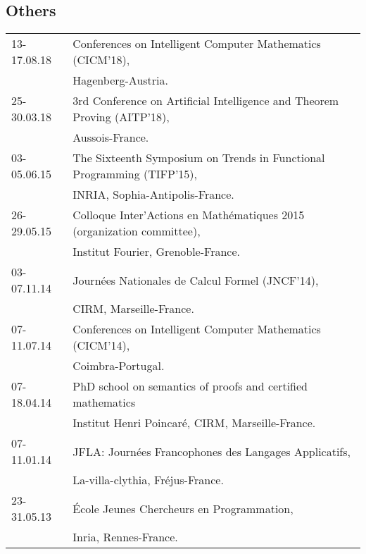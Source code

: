 \documentclass[a4paper,9pt]{article} %
\begin{document}
\subsection*{Others}
\begin{tabular}{ll}	
{\small13-17.08.18} & Conferences on Intelligent Computer Mathematics (CICM'18),\\
& Hagenberg-Austria.\\[0.25cm]
{\small25-30.03.18} & 3rd Conference on Artificial Intelligence and Theorem Proving (AITP'18),\\
& Aussois-France.\\[0.25cm]
{\small03-05.06.15} & The Sixteenth Symposium on Trends in Functional Programming (TIFP'15),\\
& INRIA, Sophia-Antipolis-France.\\[0.25cm]
{\small26-29.05.15}  & Colloque Inter'Actions en Mathématiques 2015 (organization committee), \\
& Institut Fourier, Grenoble-France.\\[0.25cm]
{\small03-07.11.14} & Journées Nationales de Calcul Formel (JNCF'14),\\
& CIRM, Marseille-France.\\[0.25cm]
{\small07-11.07.14} & Conferences on Intelligent Computer Mathematics (CICM'14), \\
& Coimbra-Portugal.\\[0.25cm]
{\small07-18.04.14} & PhD school on semantics of proofs and certified mathematics \\
& Institut Henri Poincaré, CIRM, Marseille-France. \\[0.25cm]
{\small07-11.01.14} & JFLA: Journées Francophones des Langages Applicatifs, \\
& La-villa-clythia, Fréjus-France. \\[0.25cm]
{\small23-31.05.13} & École Jeunes Chercheurs en Programmation,\\
& Inria, Rennes-France.
\end{tabular}
\end{document}

